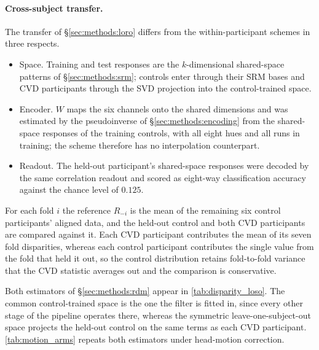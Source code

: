 \paragraph{Cross-subject transfer.}
The transfer of \S\ref{sec:methods:loro} differs from the within-participant schemes in three respects.
\begin{itemize}
\item Space. Training and test responses are the $k$-dimensional shared-space patterns of \S\ref{sec:methods:srm}; controls enter through their SRM bases and CVD participants through the SVD projection into the control-trained space.
\item Encoder. $W$ maps the six channels onto the shared dimensions and was estimated by the pseudoinverse of \S\ref{sec:methods:encoding} from the shared-space responses of the training controls, with all eight hues and all runs in training; the scheme therefore has no interpolation counterpart.
\item Readout. The held-out participant's shared-space responses were decoded by the same correlation readout and scored as eight-way classification accuracy against the chance level of $0.125$.
\end{itemize}


For each fold $i$ the reference $R_{-i}$ is the mean of the remaining six control participants' aligned data, and the held-out control and both CVD participants are compared against it. Each CVD participant contributes the mean of its seven fold disparities, whereas each control participant contributes the single value from the fold that held it out, so the control distribution retains fold-to-fold variance that the CVD statistic averages out and the comparison is conservative.

Both estimators of \S\ref{sec:methods:rdm} appear in \cref{tab:disparity_loso}. The common control-trained space is the one the filter is fitted in, since every other stage of the pipeline operates there, whereas the symmetric leave-one-subject-out space projects the held-out control on the same terms as each CVD participant. \cref{tab:motion_arms} repeats both estimators under head-motion correction.

